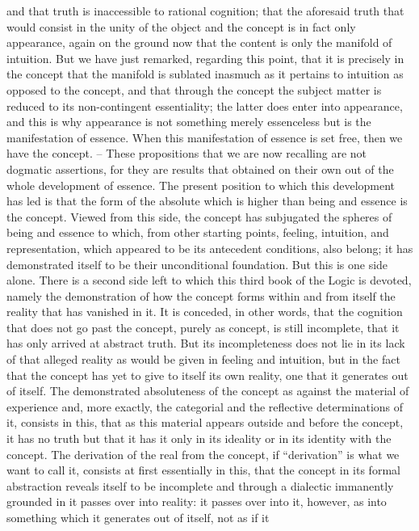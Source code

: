 and that truth is inaccessible to rational cognition; that the aforesaid truth
that would consist in the unity of the object and the concept is in fact
only appearance, again on the ground now that the content is only the
manifold of intuition. But we have just remarked, regarding this point,
that it is precisely in the concept that the manifold is sublated inasmuch
as it pertains to intuition as opposed to the concept, and that through the
concept the subject matter is reduced to its non-contingent essentiality;
the latter does enter into appearance, and this is why appearance is not
something merely essenceless but is the manifestation of essence. When
this manifestation of essence is set free, then we have the concept. – These
propositions that we are now recalling are not dogmatic assertions, for
they are results that obtained on their own out of the whole development
of essence. The present position to which this development has led is that
the form of the absolute which is higher than being and essence is the
concept. Viewed from this side, the concept has subjugated the spheres of
being and essence to which, from other starting points, feeling, intuition,
and representation, which appeared to be its antecedent conditions, also
belong; it has demonstrated itself to be their unconditional foundation. But
this is one side alone. There is a second side left to which this third book of
the Logic is devoted, namely the demonstration of how the concept forms
within and from itself the reality that has vanished in it. It is conceded, in
other words, that the cognition that does not go past the concept, purely
as concept, is still incomplete, that it has only arrived at abstract truth. But
its incompleteness does not lie in its lack of that alleged reality as would be
given in feeling and intuition, but in the fact that the concept has yet to give
to itself its own reality, one that it generates out of itself. The demonstrated
absoluteness of the concept as against the material of experience and, more
exactly, the categorial and the reflective determinations of it, consists in
this, that as this material appears outside and before the concept, it has no
truth but that it has it only in its ideality or in its identity with the concept.
The derivation of the real from the concept, if “derivation” is what we
want to call it, consists at first essentially in this, that the concept in its
formal abstraction reveals itself to be incomplete and through a dialectic
immanently grounded in it passes over into reality: it passes over into it,
however, as into something which it generates out of itself, not as if it
